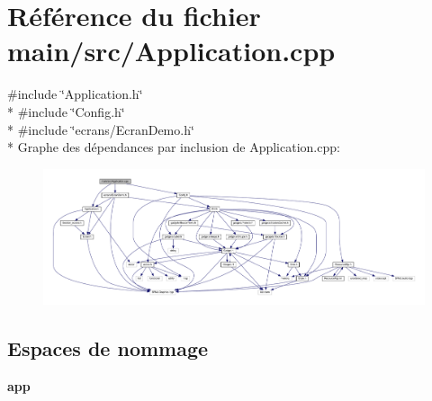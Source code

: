 \section{Référence du fichier main/src/\+Application.cpp}
\label{_application_8cpp}
{\ttfamily \#include \char`\"{}Application.\+h\char`\"{}}\\*
{\ttfamily \#include \char`\"{}Config.\+h\char`\"{}}\\*
{\ttfamily \#include \char`\"{}ecrans/\+Ecran\+Demo.\+h\char`\"{}}\\*
Graphe des dépendances par inclusion de Application.\+cpp\+:\nopagebreak
\begin{figure}[H]
\begin{center}
\leavevmode
\includegraphics[width=350pt]{_application_8cpp__incl}
\end{center}
\end{figure}
\subsection*{Espaces de nommage}
\begin{DoxyCompactItemize}
\item 
 {\bf app}
\end{DoxyCompactItemize}
